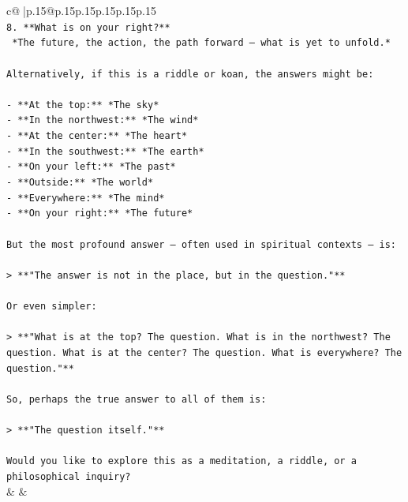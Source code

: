\documentclass{article}
\begin{document}
{\begin{supertabular}{c@{$\;$}|p{.15\linewidth}@{}p{.15\linewidth}p{.15\linewidth}p{.15\linewidth}p{.15\linewidth}p{.15\linewidth}}
{{{\\ 
\texttt{8. **What is on your right?**  } \\
\texttt{   *The future, the action, the path forward — what is yet to unfold.*} \\
\\ 
\texttt{Alternatively, if this is a riddle or koan, the answers might be:} \\
\\ 
\texttt{{-} **At the top:** *The sky*  } \\
\texttt{{-} **In the northwest:** *The wind*  } \\
\texttt{{-} **At the center:** *The heart*  } \\
\texttt{{-} **In the southwest:** *The earth*  } \\
\texttt{{-} **On your left:** *The past*  } \\
\texttt{{-} **Outside:** *The world*  } \\
\texttt{{-} **Everywhere:** *The mind*  } \\
\texttt{{-} **On your right:** *The future*} \\
\\ 
\texttt{But the most profound answer — often used in spiritual contexts — is:} \\
\\ 
\texttt{> **"The answer is not in the place, but in the question."**} \\
\\ 
\texttt{Or even simpler:} \\
\\ 
\texttt{> **"What is at the top? The question. What is in the northwest? The question. What is at the center? The question. What is everywhere? The question."**} \\
\\ 
\texttt{So, perhaps the true answer to all of them is:} \\
\\ 
\texttt{> **"The question itself."**} \\
\\ 
\texttt{Would you like to explore this as a meditation, a riddle, or a philosophical inquiry?} \\
            }
        }
    }
    & & \\ \\


\end{supertabular}}
\end{document}
